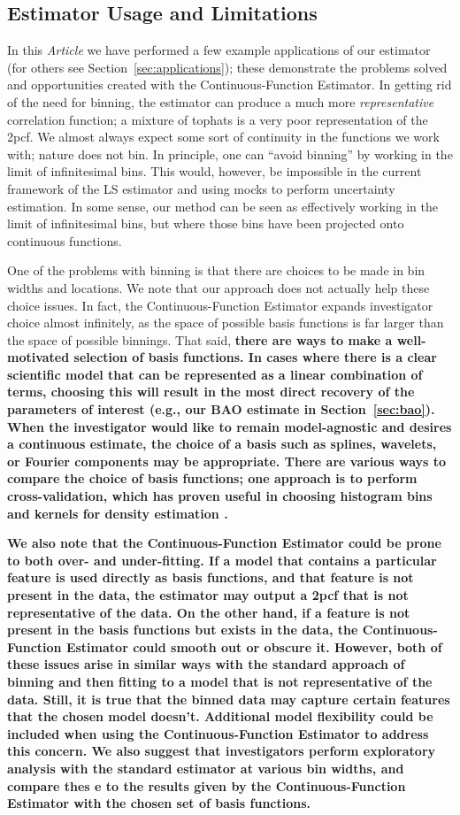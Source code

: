 \documentclass[modern]{aastex62}
\newcommand{\cf}{2pcf\xspace}
\newcommand{\est}{the Continuous-Function Estimator\xspace}
\newcommand{\documentname}{\textsl{Article}\xspace}
\newcommand{\LS}{LS\xspace}
\newcommand{\new}[1]{\textbf{#1}}
\begin{document}
\subsection{Estimator Usage and Limitations}

In this \documentname we have performed a few example applications of our estimator (for others see Section~\ref{sec:applications}); these demonstrate the problems solved and opportunities created with \est.
In getting rid of the need for binning, the estimator can produce a much more \textit{representative} correlation function; a mixture of tophats is a very poor representation of the \cf. 
We almost always expect some sort of continuity in the functions we work with; nature does not bin.
In principle, one can ``avoid binning'' by working in the limit of infinitesimal bins.
This would, however, be impossible in the current framework of the \LS estimator and using mocks to perform uncertainty estimation.
In some sense, our method can be seen as effectively working in the limit of infinitesimal bins, but where those bins have been projected onto continuous functions.

One of the problems with binning is that there are choices to be made in bin widths and locations.
We note that our approach does not actually help these choice issues.
In fact, \est expands investigator choice almost infinitely, as the space of possible basis functions is far larger than the space of possible binnings.
That said, \new{there are ways to make a well-motivated selection of basis functions.
In cases where there is a clear scientific model that can be represented as a linear combination of terms, choosing this will result in the most direct recovery of the parameters of interest (e.g., our BAO estimate in Section~\ref{sec:bao}).
When the investigator would like to remain model-agnostic and desires a continuous estimate, the choice of a basis such as splines, wavelets, or Fourier components may be appropriate.
There are various ways to compare the choice of basis functions; one approach is to perform cross-validation, which has proven useful in choosing histogram bins and kernels for density estimation \citep{Rudemo1982, Hogg2008}.}

\new{We also note that \est could be prone to both over- and under-fitting.
If a model that contains a particular feature is used directly as basis functions, and that feature is not present in the data, the estimator may output a \cf that is not representative of the data.
On the other hand, if a feature is not present in the basis functions but exists in the data, \est could smooth out or obscure it.
However, both of these issues arise in similar ways with the standard approach of binning and then fitting to a model that is not representative of the data.
Still, it is true that the binned data may capture certain features that the chosen model doesn't.
Additional model flexibility could be included when using \est to address this concern.
We also suggest that investigators perform exploratory analysis with the standard estimator at various bin widths, and compare thes e to the results given by \est with the chosen set of basis functions.}
\end{document}
